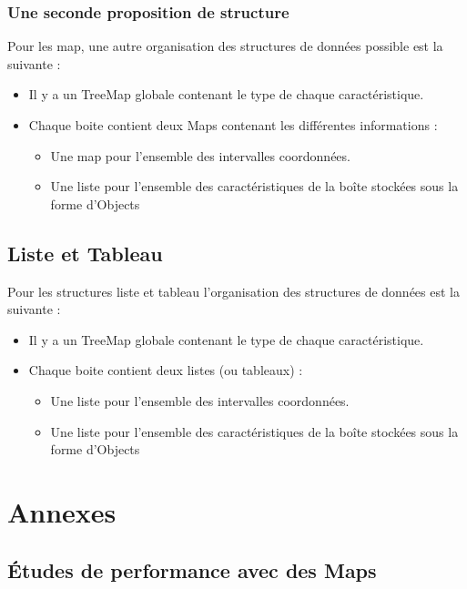 \subsection{Une seconde proposition de structure}
Pour les map, une autre organisation des structures de données possible est la suivante :
\begin{itemize}
\item Il y a un TreeMap globale contenant le type de chaque caractéristique.
 \item Chaque boite contient deux Maps contenant les différentes informations :
\begin{itemize}
 \item Une map pour l'ensemble des intervalles coordonnées.
\item Une liste pour l'ensemble des caractéristiques de la boîte stockées sous la forme d'Objects
\end{itemize}
\end{itemize}



\section{Liste et Tableau}
Pour les structures liste et tableau l'organisation des structures de données est la suivante :
\begin{itemize}
\item Il y a un TreeMap globale contenant le type de chaque caractéristique.
 \item Chaque boite contient deux listes (ou tableaux) :
\begin{itemize}
 \item Une liste pour l'ensemble des intervalles coordonnées.
\item Une liste pour l'ensemble des caractéristiques de la boîte stockées sous la forme d'Objects
\end{itemize}
\end{itemize}


\appendix

\chapter{Annexes}
\section{Études de performance avec des Maps}

